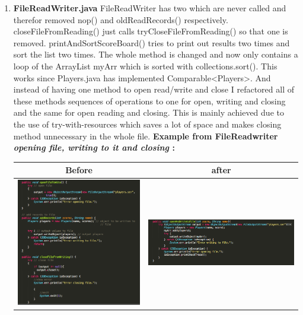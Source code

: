 \documentclass{article}
\begin{document}
\begin{enumerate}
	\item
	\textbf{FileReadWriter.java}
	FileReadWriter has two which are never called and therefor removed nop() and oldReadRecords()
	respectively.
	closeFileFromReading() just calls tryCloseFileFromReading() so that one is removed.
	printAndSortScoreBoard() tries to print out results two times and sort the list two times.
	The whole method is changed and now only contains a loop of the ArrayList myArr which is sorted
	with collections.sort(). This works since Players.java has implemented Comparable<Players>.
	And instead of having one method to open read/write and close I refactored all of these methods
	sequences of operations to one for open, writing and closing and the same for open reading and closing. This is mainly achieved due to the use of try-with-resources which saves a lot of space and
	makes closing method unnecessary in the whole file. 
	\textbf{Example from FileReadwriter \textit{opening file, writing to it and closing} :\newline}
	\hspace*{-2.0cm}\begin{tabulary}{0.5\textwidth}{| c | c |}
	 \hline
	 Before & after \\ \hline
	\includegraphics[scale=0.4]{FileReadWriter-EXAMPLE-BEFORE.png} & \includegraphics[scale=0.4]{FileReaderWriter-EXAMPLE-AFTER.png} \\ \hline
	\end{tabulary}


\end{enumerate}
\end{document}

